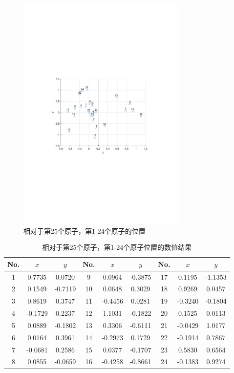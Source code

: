 \documentclass[12pt,a4paper]{article}
\begin{document}
\begin{figure}[t]
    \centering
    \includegraphics[width=0.75\textwidth,trim={3.09cm 9.295cm 3.09cm 9.295cm},clip]{fig/ex5_coords.pdf}
    \caption{相对于第25个原子，第1-24个原子的位置}
    \label{fig:ex5_coords}
\end{figure}

\begin{table}[h]
    \centering 
    \caption{相对于第25个原子，第1-24个原子位置的数值结果}
    \label{tab:ex5_coords}
    \begin{tabular}{ccc|ccc|ccc}
        \toprule
        No. & \(x\) & \(y\) & No. & \(x\) & \(y\) & No. & \(x\) &
        \(y\)\tabularnewline
        \midrule
        1 & 0.7735 & 0.0720 & 9 & 0.0964 & -0.3875 & 17 & 0.1195 &
        -1.1353\tabularnewline
        2 & 0.1549 & -0.7119 & 10 & 0.0648 & 0.3029 & 18 & 0.9269 &
        0.0457\tabularnewline
        3 & 0.8619 & 0.3747 & 11 & -0.4456 & 0.0281 & 19 & -0.3240 &
        -0.1804\tabularnewline
        4 & -0.1729 & 0.2237 & 12 & 1.1031 & -0.1822 & 20 & 0.1525 &
        0.0113\tabularnewline
        5 & 0.0889 & -0.1802 & 13 & 0.3306 & -0.6111 & 21 & -0.0429 &
        1.0177\tabularnewline
        6 & 0.0164 & 0.3961 & 14 & -0.2973 & 0.1729 & 22 & -0.1914 &
        0.7867\tabularnewline
        7 & -0.0681 & 0.2586 & 15 & 0.0377 & -0.1707 & 23 & 0.5830 &
        0.6564\tabularnewline
        8 & 0.0855 & -0.0659 & 16 & -0.4258 & -0.8661 & 24 & -0.1383 &
        0.9274\tabularnewline
        \bottomrule
    \end{tabular}
\end{table}
\end{document}
